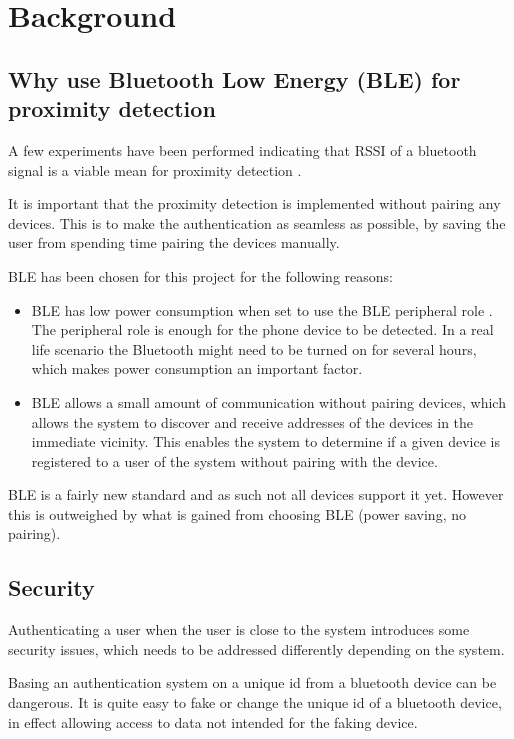 \section{Background}

\subsection{Why use Bluetooth Low Energy (BLE) for proximity detection}

A few experiments have been performed indicating that RSSI of a bluetooth signal is a viable mean for proximity detection \cite{ref:Takashi}. 

It is important that the proximity detection is implemented without pairing any devices. This is to make the authentication as seamless as possible, by saving the user from spending time pairing the devices manually.

BLE has been chosen for this project for the following reasons:
\begin{itemize}
	\item BLE has low power consumption when set to use the BLE peripheral role \cite{ref:Power_usage}. The peripheral role is enough for the phone device to be detected. In a real life scenario the Bluetooth might need to be turned on for several hours, which makes power consumption an important factor.
	\item BLE allows a small amount of communication without pairing devices, which allows the system to discover and receive addresses of the devices in the immediate vicinity. This enables the system to determine if a given device is registered to a user of the system without pairing with the device.
\end{itemize}

BLE is a fairly new standard and as such not all devices support it yet. However this is outweighed by what is gained from choosing BLE (power saving, no pairing). 

\subsection{Security}

Authenticating a user when the user is close to the system introduces some security issues, which needs to be addressed differently depending on the system.

Basing an authentication system on a unique id from a bluetooth device can be dangerous. It is quite easy to fake or change the unique id of a bluetooth device, in effect allowing access to data not intended for the faking device.

